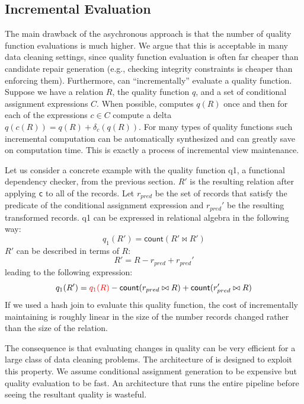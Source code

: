 \subsection{Incremental Evaluation}
The main drawback of the asychronous approach is that the number of quality function evaluations is much higher. We argue that this is acceptable in many data cleaning settings, since quality function evaluation is often far cheaper than candidate repair generation (e.g., checking integrity constraints is cheaper than enforcing them). Furthermore, \sys can ``incrementally'' evaluate a quality function. 
Suppose we have a relation $R$, the quality function $q$, and a set of conditional assignment expressions $C$.
When possible, \sys computes $q(R)$ once and then for each of the expressions $c \in C$ compute a delta $q(c(R)) = q(R) + \delta_c(q(R))$.
For many types of quality functions such incremental computation can be automatically synthesized and can greatly save on computation time.
This is exactly a process of incremental view maintenance.

Let us consider a concrete example with the quality function q1, a functional dependency checker, from the previous section.
$R'$ is the resulting relation after applying \texttt{c} to all of the records.
Let $r_{pred}$ be the set of records that satisfy the predicate of the conditional assignment expression and $r_{pred}'$ be the resulting transformed records.
q1 can be expressed in relational algebra in the following way:
\[
q_1(R') = \textsf{count}( R' \bowtie R' )
\]
$R'$ can be described in terms of $R$:
\[
R' = R - r_{pred} + r_{pred}' 
\]
leading to the following expression:
\[
q_1(R') = \textcolor{red}{q_1(R)} - \textsf{count}( r_{pred} \bowtie R )  + \textsf{count}( r'_{pred} \bowtie R )
\]
If we used a hash join to evaluate this quality function, the cost of incrementally maintaining is roughly linear in the size of the number records changed rather than the size of the relation.

The consequence is that evaluating changes in quality can be very efficient for a large class of data cleaning problems.
The architecture of \sys is designed to exploit this property.
We assume conditional assignment generation to be expensive but quality evaluation to be fast.
An architecture that runs the entire pipeline before seeing the resultant quality is wasteful.




